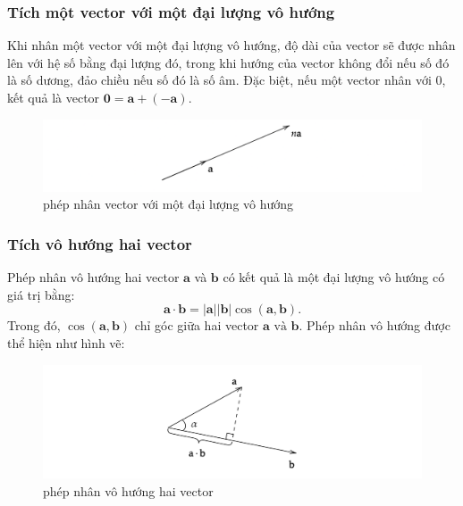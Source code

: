 \subsubsection{Tích một vector với một đại lượng vô hướng}
Khi nhân một vector với một đại lượng vô hướng, độ dài của vector sẽ được nhân lên với hệ số bằng đại lượng đó, trong khi hướng của vector không đổi nếu số đó là số dương, đảo chiều nếu số đó là số âm. Đặc biệt, nếu một vector nhân với \(0\), kết quả là vector \(\mathbf{0}=\mathbf{a}+(-\mathbf{a})\).
\begin{figure}[H]
    \centering
    \includegraphics[width=1\textwidth]{Tuan2/Figures/vector x vo huong.png}
    \caption{phép nhân vector với một đại lượng vô hướng}
\end{figure}

\subsubsection{Tích vô hướng hai vector}
Phép nhân vô hướng hai vector \(\mathbf{a}\) và \(\mathbf{b}\) có kết quả là một đại lượng vô hướng có giá trị bằng:
\begin{equation}
    \mathbf{a} \cdot \mathbf{b} = |\mathbf{a}| |\mathbf{b}| \cos (\mathbf{a}, \mathbf{b}).
\end{equation}
Trong đó, \(\cos (\mathbf{a}, \mathbf{b})\) chỉ góc giữa hai vector \(\mathbf{a} \text{ và }\mathbf{b}\).
Phép nhân vô hướng được thể hiện như hình vẽ:
\begin{figure}[H]
    \centering
    \includegraphics[width=1\textwidth]{Tuan2/Figures/tichcham.png}
    \caption{phép nhân vô hướng hai vector}
\end{figure}
